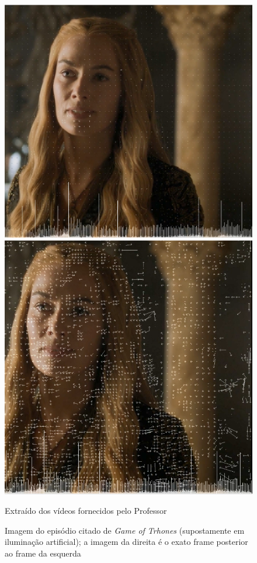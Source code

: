 \begin{figure}[H]
    \centering
    \caption{Imagem do episódio citado de \textit{Game of Trhones} (supostamente em iluminação artificial); a imagem da direita é o exato frame posterior ao frame da esquerda}
    \label{fig:imagem20-21}
    
    \includegraphics[scale=0.3]{Documeto/1-ElementosTextuais/images/20.png}
    \includegraphics[scale=0.3]{Documeto/1-ElementosTextuais/images/21.png}

    \small
    Extraído dos vídeos fornecidos pelo Professor
\end{figure}



